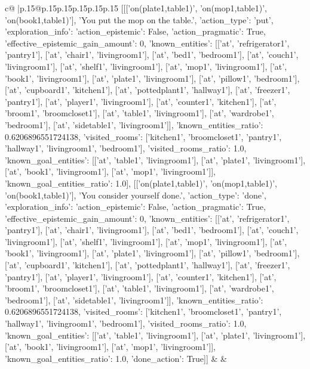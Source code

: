\documentclass{article}
\begin{document}
{\begin{supertabular}{c@{$\;$}|p{.15\linewidth}@{}p{.15\linewidth}p{.15\linewidth}p{.15\linewidth}p{.15\linewidth}p{.15\linewidth}}
{{{	 [[['on(plate1,table1)', 'on(mop1,table1)', 'on(book1,table1)'], 'You put the mop on the table.', {'action_type': 'put', 'exploration_info': {'action_epistemic': False, 'action_pragmatic': True, 'effective_epistemic_gain_amount': 0, 'known_entities': [['at', 'refrigerator1', 'pantry1'], ['at', 'chair1', 'livingroom1'], ['at', 'bed1', 'bedroom1'], ['at', 'couch1', 'livingroom1'], ['at', 'shelf1', 'livingroom1'], ['at', 'mop1', 'livingroom1'], ['at', 'book1', 'livingroom1'], ['at', 'plate1', 'livingroom1'], ['at', 'pillow1', 'bedroom1'], ['at', 'cupboard1', 'kitchen1'], ['at', 'pottedplant1', 'hallway1'], ['at', 'freezer1', 'pantry1'], ['at', 'player1', 'livingroom1'], ['at', 'counter1', 'kitchen1'], ['at', 'broom1', 'broomcloset1'], ['at', 'table1', 'livingroom1'], ['at', 'wardrobe1', 'bedroom1'], ['at', 'sidetable1', 'livingroom1']], 'known_entities_ratio': 0.6206896551724138, 'visited_rooms': ['kitchen1', 'broomcloset1', 'pantry1', 'hallway1', 'livingroom1', 'bedroom1'], 'visited_rooms_ratio': 1.0, 'known_goal_entities': [['at', 'table1', 'livingroom1'], ['at', 'plate1', 'livingroom1'], ['at', 'book1', 'livingroom1'], ['at', 'mop1', 'livingroom1']], 'known_goal_entities_ratio': 1.0}}], [['on(plate1,table1)', 'on(mop1,table1)', 'on(book1,table1)'], 'You consider yourself done.', {'action_type': 'done', 'exploration_info': {'action_epistemic': False, 'action_pragmatic': True, 'effective_epistemic_gain_amount': 0, 'known_entities': [['at', 'refrigerator1', 'pantry1'], ['at', 'chair1', 'livingroom1'], ['at', 'bed1', 'bedroom1'], ['at', 'couch1', 'livingroom1'], ['at', 'shelf1', 'livingroom1'], ['at', 'mop1', 'livingroom1'], ['at', 'book1', 'livingroom1'], ['at', 'plate1', 'livingroom1'], ['at', 'pillow1', 'bedroom1'], ['at', 'cupboard1', 'kitchen1'], ['at', 'pottedplant1', 'hallway1'], ['at', 'freezer1', 'pantry1'], ['at', 'player1', 'livingroom1'], ['at', 'counter1', 'kitchen1'], ['at', 'broom1', 'broomcloset1'], ['at', 'table1', 'livingroom1'], ['at', 'wardrobe1', 'bedroom1'], ['at', 'sidetable1', 'livingroom1']], 'known_entities_ratio': 0.6206896551724138, 'visited_rooms': ['kitchen1', 'broomcloset1', 'pantry1', 'hallway1', 'livingroom1', 'bedroom1'], 'visited_rooms_ratio': 1.0, 'known_goal_entities': [['at', 'table1', 'livingroom1'], ['at', 'plate1', 'livingroom1'], ['at', 'book1', 'livingroom1'], ['at', 'mop1', 'livingroom1']], 'known_goal_entities_ratio': 1.0}, 'done_action': True}]] 
	  } 
	   } 
	   } 
	 & & \\ 
 

    \theutterance {}  


\end{supertabular}}
\end{document}
